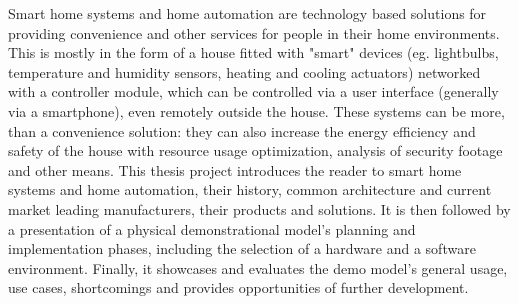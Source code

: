 Smart home systems and home automation are technology based solutions for providing convenience and other services for people in their home environments. This is mostly in the form of a house fitted with "smart" devices (eg. lightbulbs, temperature and humidity sensors, heating and cooling actuators) networked with a controller module, which can be controlled via a user interface (generally via a smartphone), even remotely outside the house. These systems can be more, than a convenience solution: they can also increase the energy efficiency and safety of the house with resource usage optimization, analysis of security footage and other means. This thesis project introduces the reader to smart home systems and home automation, their history, common architecture and current market leading manufacturers, their products and solutions. It is then followed by a presentation of a physical demonstrational model's planning and implementation phases, including the selection of a hardware and a software environment. Finally, it showcases and evaluates the demo model's general usage, use cases, shortcomings and provides opportunities of further development.

\vfill
\selectthesislanguage

\setcounter{romanPage}{\value{page}}
